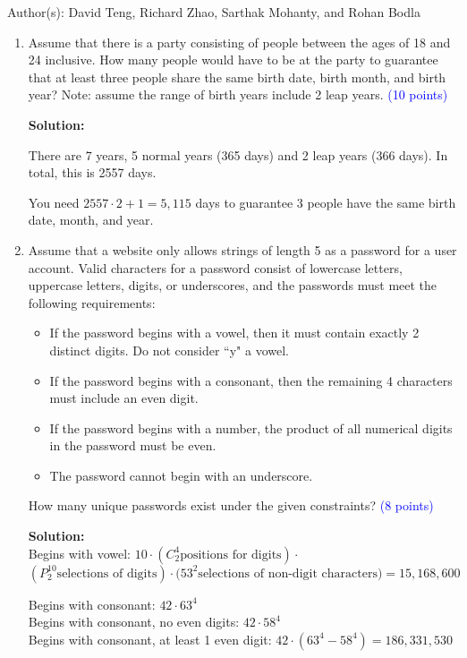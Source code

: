 \documentclass{article}
\newcommand{\pt}[1]{\textcolor{blue}{(#1 points)}}
\newenvironment{solution}
{
\par
\color{blue}
\textbf{Solution:}
}
{
\par
}
\begin{document}
Author(s): David Teng, Richard Zhao, Sarthak Mohanty, and Rohan Bodla
\newpage
\begin{enumerate}

\item Assume that there is a party consisting of people between the ages of 18 and 24 inclusive. How many people would have to be at the party to guarantee that at least three people share the same birth date, birth month, and birth year? Note: assume the range of birth years include 2 leap years. \pt{10}
\begin{solution}
There are 7 years, 5 normal years (365 days) and 2 leap years (366 days). In total, this is 2557 days.

You need $2557 \cdot 2 + 1 = 5,115$ days to guarantee 3 people have the same birth date, month, and year.
\end{solution}

\item Assume that a website only allows strings of length 5 as a password for a user account. Valid characters for a password consist of lowercase letters, uppercase letters, digits, or underscores, and the passwords must meet the following requirements:
\begin{itemize}
    \item If the password begins with a vowel, then it must contain exactly 2 distinct digits. Do not consider ``y" a vowel.
    \item If the password begins with a consonant, then the remaining 4 characters must include an even digit.
    \item If the password begins with a number, the product of all numerical digits in the password must be even.
    \item The password cannot begin with an underscore.
\end{itemize} How many unique passwords exist under the given constraints? \pt{8}
\begin{solution}\\
Begins with vowel: $10 \cdot (C^4_2\text{positions for digits}) \cdot$ \\ $(P^{10}_2\text{selections of digits}) \cdot (53^2\text{selections of non-digit characters)} = 15,168,600$

Begins with consonant: $42 \cdot 63^4$\\
Begins with consonant, no even digits: $42 \cdot 58^4$\\
Begins with consonant, at least 1 even digit: $42 \cdot (63^4 - 58^4) = 186,331,530$


\end{solution}
\end{enumerate}
\end{document}
